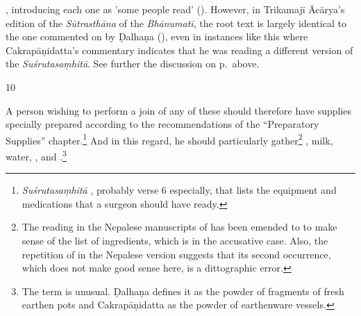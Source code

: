 \begin{translation}
{            \citep[128–129]{acar-1939}, introducing each one as 'some people read' (). However,  in Trikamajī Ācārya's edition of the \emph{Sūtrasthāna}
            of the \emph{Bhānumatī}, the root text is largely identical to the one commented
            on by Ḍalhaṇa (\cite{vulgate}), even in instances like this where Cakrapāṇidatta's
            commentary indicates that he was reading a different version of the
            \emph{Suśrutasaṃhitā}. See further the discussion on p.\,\pageref{skinflap}
            above.} 
            \item[10]
    
A person wishing to perform a join of any of these should therefore have
supplies specially prepared according to the recommendations of the
“Preparatory Supplies” chapter.\footnote{\emph{Suśrutasaṃhitā}
    , probably verse 6 especially, that lists the equipment and
    medications that a surgeon should have ready.}  And in this regard, he should
    particularly gather\footnote{The reading in the Nepalese manuscripts of
         has been emended to
         to make sense of the list of ingredients, which is
        in the accusative case. Also, the repetition of  in the
        Nepalese version suggests that its second occurrence, which does not make good
        sense here, is a dittographic error.} , milk,
        water, , and
        .\footnote{The term
             is unusual. Ḍalhaṇa \citep[79]{vulgate} defines it as the
            powder of fragments of fresh earthen pots and Cakrapāṇidatta
            \citep[129]{acar-1939} as the powder of earthenware vessels.}
    

\end{translation}

